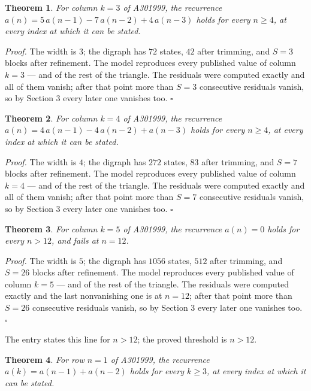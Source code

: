 \documentclass[11pt]{article}
\newtheorem{theorem}{Theorem}
\theoremstyle{definition}
\begin{document}
\begin{theorem} For column $k = 3$ of A301999, the recurrence $a(n) = 5\,a(n-1) - 7\,a(n-2) + 4\,a(n-3)$ holds for every $n \ge 4$, at every index at which it can be stated.\end{theorem}

{\itshape Proof.} The width is $3$; the digraph has $72$ states, $42$ after trimming, and $S = 3$ blocks after refinement. The model reproduces every published value of column $k = 3$ --- and of the rest of the triangle. The residuals were computed exactly and all of them vanish; after that point more than $S = 3$ consecutive residuals vanish, so by Section 3 every later one vanishes too. $\square$

\begin{theorem} For column $k = 4$ of A301999, the recurrence $a(n) = 4\,a(n-1) - 4\,a(n-2) + a(n-3)$ holds for every $n \ge 4$, at every index at which it can be stated.\end{theorem}

{\itshape Proof.} The width is $4$; the digraph has $272$ states, $83$ after trimming, and $S = 7$ blocks after refinement. The model reproduces every published value of column $k = 4$ --- and of the rest of the triangle. The residuals were computed exactly and all of them vanish; after that point more than $S = 7$ consecutive residuals vanish, so by Section 3 every later one vanishes too. $\square$

\begin{theorem} For column $k = 5$ of A301999, the recurrence $a(n) = 0$ holds for every $n > 12$, and fails at $n = 12$.\end{theorem}

{\itshape Proof.} The width is $5$; the digraph has $1056$ states, $512$ after trimming, and $S = 26$ blocks after refinement. The model reproduces every published value of column $k = 5$ --- and of the rest of the triangle. The residuals were computed exactly and the last nonvanishing one is at $n = 12$; after that point more than $S = 26$ consecutive residuals vanish, so by Section 3 every later one vanishes too. $\square$

The entry states this line for $n > 12$; the proved threshold is $n > 12$.

\begin{theorem} For row $n = 1$ of A301999, the recurrence $a(k) = a(n-1) + a(n-2)$ holds for every $k \ge 3$, at every index at which it can be stated.\end{theorem}
\end{document}
